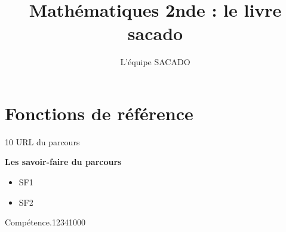 


\usepackage{tkz-tab}


\title{Mathématiques 2nde  : le livre sacado}
\author{L'équipe SACADO}




\chapter{Fonctions de référence}{10}
{URL du parcours}
{
 \begin{CpsCol}
	\textbf{Les savoir-faire du parcours}
 	\begin{itemize}
 		\item SF1
 		\item SF2
 	\end{itemize}
 \end{CpsCol}

\begin{His}
\end{His}

\begin{ExoDec}{Compétence.}{1234}{1}{0}{0}{0}
\end{ExoDec}
}


